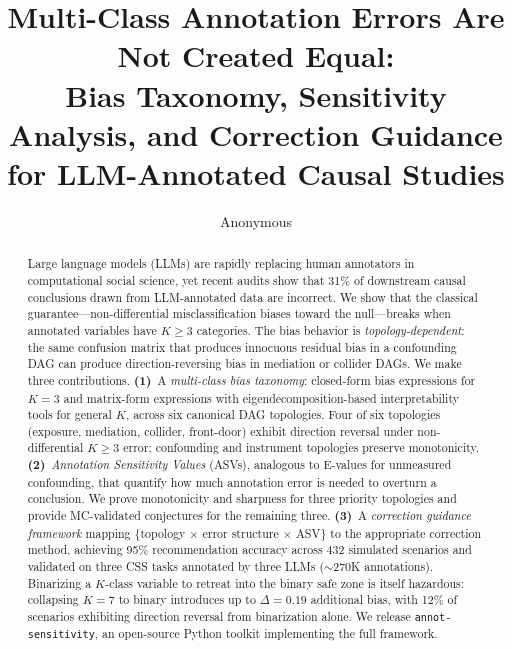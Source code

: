 \documentclass[11pt]{article}
\title{Multi-Class Annotation Errors Are Not Created Equal:\\Bias Taxonomy, Sensitivity Analysis, and Correction Guidance\\for LLM-Annotated Causal Studies}
\author{Anonymous}
\date{}
\begin{document}
\maketitle

\begin{abstract}
Large language models (LLMs) are rapidly replacing human annotators in computational social science, yet recent audits show that 31\% of downstream causal conclusions drawn from LLM-annotated data are incorrect.
We show that the classical guarantee---non-differential misclassification biases toward the null---breaks when annotated variables have $K\!\ge\!3$ categories.
The bias behavior is \emph{topology-dependent}: the same confusion matrix that produces innocuous residual bias in a confounding DAG can produce direction-reversing bias in mediation or collider DAGs.
We make three contributions.
\textbf{(1)}~A \emph{multi-class bias taxonomy}: closed-form bias expressions for $K\!=\!3$ and matrix-form expressions with eigendecomposition-based interpretability tools for general $K$, across six canonical DAG topologies.
Four of six topologies (exposure, mediation, collider, front-door) exhibit direction reversal under non-differential $K\!\ge\!3$ error; confounding and instrument topologies preserve monotonicity.
\textbf{(2)}~\emph{Annotation Sensitivity Values} (ASVs), analogous to E-values for unmeasured confounding, that quantify how much annotation error is needed to overturn a conclusion.
We prove monotonicity and sharpness for three priority topologies and provide MC-validated conjectures for the remaining three.
\textbf{(3)}~A \emph{correction guidance framework} mapping \{topology $\times$ error structure $\times$ ASV\} to the appropriate correction method, achieving 95\% recommendation accuracy across 432 simulated scenarios and validated on three CSS tasks annotated by three LLMs (${\sim}270$K annotations).
Binarizing a $K$-class variable to retreat into the binary safe zone is itself hazardous: collapsing $K\!=\!7$ to binary introduces up to $\Delta\!=\!0.19$ additional bias, with 12\% of scenarios exhibiting direction reversal from binarization alone.
We release \texttt{annot-sensitivity}, an open-source Python toolkit implementing the full framework.
\end{abstract}

\end{document}
